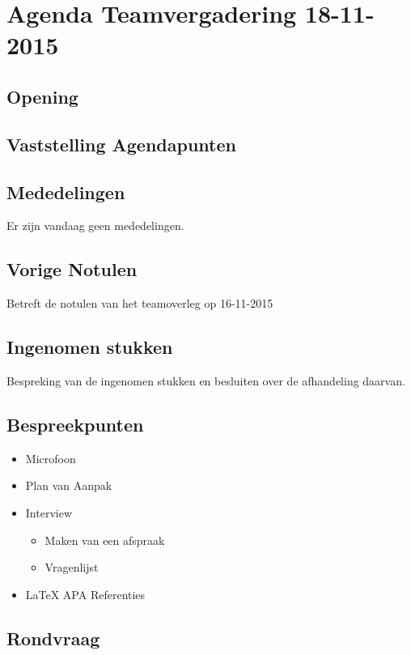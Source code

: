 \documentclass[dutch]{hu}
\date{18 november 2015}
\subtitle{Agenda Teamvergadering \vergaderingDatum}
\def \vergaderingDatum{18-11-2015}
\begin{document}
\maketitle
\chapter{Agenda Teamvergadering \vergaderingDatum}
\section{Opening}

\section{Vaststelling Agendapunten}

\section{Mededelingen}
Er zijn vandaag geen mededelingen.

\section{Vorige Notulen}
Betreft de notulen van het teamoverleg op 16-11-2015

\section{Ingenomen stukken}
Bespreking van de ingenomen stukken en besluiten over de afhandeling daarvan.

\section{Bespreekpunten}
\begin{itemize}
\item Microfoon
\item Plan van Aanpak
\item Interview
	\begin{itemize}
	\item Maken van een afspraak
	\item Vragenlijst
	\end{itemize}
\item LaTeX APA Referenties
\end{itemize}

\section{Rondvraag}
\end{document}
